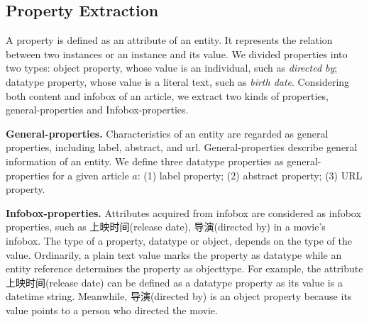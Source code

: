 \documentclass[runningheads,a4paper]{llncs}
\newcommand{\para}[1]{\vspace{0.1cm}\noindent\textbf{#1}}
\begin{document}
\begin{CJK*}{UTF8}{song}
\subsection{Property Extraction}
\label{sec:pe}
A property is defined as an attribute of an entity. It represents the relation between two instances or an instance and its value. We divided properties into two types: object property, whose value is an individual, such as \emph{directed by}; datatype property, whose value is a literal text, such as \emph{birth date}. Considering both content and infobox of an article, we extract two kinds of properties, general-properties and Infobox-properties.

\para{General-properties.} Characteristics of an entity are regarded as general properties, including label, abstract, and url. General-properties describe general information of an entity. We define three datatype properties as general-properties for a given article $a$: (1) label property; (2) abstract property; (3) URL property.

\para{Infobox-properties.} Attributes acquired from infobox are considered as infobox properties, such as 上映时间(release date), 导演(directed by) in a movie's infobox. The type of a property, datatype or object, depends on the type of the value. Ordinarily, a plain text value marks the property as datatype while an entity reference determines the property as objecttype. For example, the attribute 上映时间(release date) can be defined as a datatype property as its value is a datetime string. Meanwhile, 导演(directed by) is an object property because its value points to a person who directed the movie.


\end{CJK*}
\end{document}
